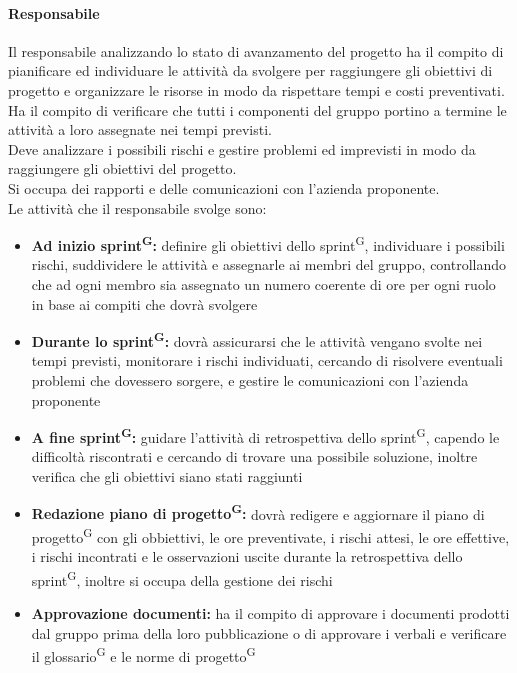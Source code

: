 \documentclass[a4paper, 11pt]{article}
\begin{document}
\paragraph{Responsabile}
Il responsabile analizzando lo stato di avanzamento del progetto ha il compito di pianificare ed individuare le attività da svolgere 
    per raggiungere gli obiettivi di progetto e organizzare le risorse in modo da rispettare tempi e costi preventivati. \\
    Ha il compito di verificare che tutti i componenti del gruppo portino a termine le attività a loro assegnate nei tempi previsti. \\
    Deve analizzare i possibili rischi e gestire problemi ed imprevisti in modo da raggiungere gli obiettivi del progetto.\\
    Si occupa dei rapporti e delle comunicazioni con l'azienda proponente.\\
    Le attività che il responsabile svolge sono:\\
    \begin{itemize}
        \item \textbf{Ad inizio sprint\textsuperscript{G}:} definire gli obiettivi dello sprint\textsuperscript{G}, individuare i possibili rischi, suddividere le attività 
        e assegnarle ai membri del gruppo, controllando che ad ogni membro sia assegnato un numero coerente di ore per ogni ruolo in base ai compiti che dovrà svolgere
        \item \textbf{Durante lo sprint\textsuperscript{G}:} dovrà assicurarsi che le attività vengano svolte nei tempi previsti, monitorare i rischi individuati, cercando di risolvere 
        eventuali problemi che dovessero sorgere, e gestire le comunicazioni con l'azienda proponente
        \item \textbf{A fine sprint\textsuperscript{G}:} guidare l'attività di retrospettiva dello sprint\textsuperscript{G}, capendo le difficoltà riscontrati e cercando di trovare una possibile soluzione, inoltre
          verifica che gli obiettivi siano stati raggiunti
        \item \textbf{Redazione piano di progetto\textsuperscript{G}:} dovrà redigere e aggiornare il piano di progetto\textsuperscript{G} con gli obbiettivi, le ore preventivate, i rischi attesi, le ore effettive,
          i rischi incontrati e le osservazioni uscite durante la retrospettiva dello sprint\textsuperscript{G}, inoltre si occupa della gestione dei rischi 
        \item \textbf{Approvazione documenti:} ha il compito di approvare i documenti prodotti dal gruppo prima della loro pubblicazione 
        o di approvare i verbali e verificare il glossario\textsuperscript{G} e le norme di progetto\textsuperscript{G} 
    \end{itemize}
\end{document}
